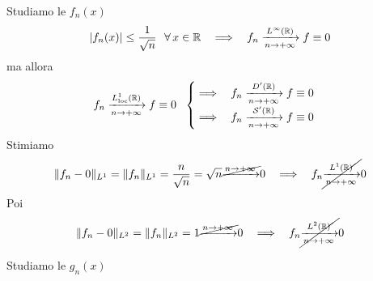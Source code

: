 \Soluzione

Studiamo le $f_{n}(x)$
\begin{equation*}
| f_{n}(x)| \leq \frac{1}{\sqrt{n}} \ \ \forall x\in \RR \ \ \implies \ \ f_{n}\xrightarrow[n\rightarrow + \infty ]{L^{\infty}(\RR)} f\equiv 0
\end{equation*}
ma allora
\begin{equation*}
f_{n}\xrightarrow[n\rightarrow + \infty ]{L^{1}_{\operatorname{loc}}(\mathbb{R})} f\equiv 0\ \
\begin{cases}
\implies \ \ f_{n}\xrightarrow[n\rightarrow + \infty ]{D'(\mathbb{R})} f\equiv 0\\
\implies \ \ f_{n}\xrightarrow[n\rightarrow + \infty ]{\mathcal{S}'(\mathbb{R})} f\equiv 0
\end{cases}
\end{equation*}
Stimiamo
\begin{equation*}
\Vert f_{n} - 0\Vert_{L^{1}} = \Vert f_{n}\Vert_{L^{1}} = \frac{n}{\sqrt{n}} = \sqrt{n}\cancel{\xrightarrow{n\rightarrow + \infty}} 0\ \ \implies \ \ f_{n}\cancel{\xrightarrow[n\rightarrow + \infty ]{L^{1}(\RR)}} 0
\end{equation*}
Poi
\begin{equation*}
\Vert f_{n} - 0\Vert_{L^{2}} = \Vert f_{n}\Vert_{L^{2}} = 1\cancel{\xrightarrow{n\rightarrow + \infty}} 0\ \ \implies \ \ f_{n}\cancel{\xrightarrow[n\rightarrow + \infty ]{L^{2}(\mathbb{R})}} 0
\end{equation*}


Studiamo le $g_{n}(x)$

